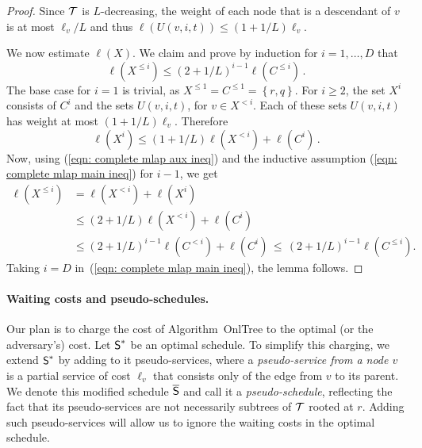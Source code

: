 \documentclass[a4paper]{article}
\newcommand{\calT}{{\cal T}}
\newcommand{\braced}[1]{{ \left\{ #1 \right\} }}
\newcommand{\length}{\ell}
\newcommand{\OnAlgTreesGeneral}{{\sc OnlTree}}
\newcommand{\optschedS}{\mbox{\rm\textsf{S}}^\ast}
\newcommand{\pseudoschedS}{\overline{\mbox{\rm\textsf{S}}}}
\begin{document}
\begin{proof}
Since $\calT$ is $L$-decreasing, the weight of each node that is a
descendant of $v$ is at most $\length_v/L$ and thus
$\length(U(v,i,t))\leq (1+1/L)\length_v$.

We now estimate $\length(X)$. We claim and prove by induction for
$i=1,\ldots,D$ that
\begin{equation}
\length(X^{\le i})\leq(2+1/L)^{i-1}\length(C^{\le i})\,.
	\label{eqn: complete mlap main ineq}
\end{equation}
The base case for $i=1$ is trivial, as $X^{\le 1}=C^{\le
  1}=\braced{r,q}$. For $i\geq 2$, the set
$X^i$ consists of $C^i$ and the sets $U(v,i,t)$,
for $v \in X^{<i}$. Each of these sets $U(v,i,t)$ has
weight at most $(1+1/L)\length_v$. Therefore
\begin{equation}
\length(X^i)\leq (1+1/L)\length(X^{<i})+\length(C^i)\,.
	\label{eqn: complete mlap aux ineq}
\end{equation}
Now, using (\ref{eqn: complete mlap aux ineq}) and the
inductive assumption (\ref{eqn: complete mlap main ineq}) for $i-1$,
we get
\begin{align*}
\length(X^{\le i})&= \length(X^{<i})+ \length(X^i)
			\\
			&\leq (2+1/L)\length(X^{<i})+\length(C^i)
			\\
			&\leq (2+1/L)^{i-1}\length(C^{<i})+\length(C^i)
			\,\leq\, (2+1/L)^{i-1}\length(C^{\le i}).
\end{align*}
Taking $i=D$ in~(\ref{eqn: complete mlap main ineq}), the lemma follows.
\end{proof}


\paragraph{Waiting costs and pseudo-schedules.}

Our plan is to charge the cost of Algorithm~{\OnAlgTreesGeneral} to
the optimal (or the adversary's) cost. Let $\optschedS$ be an optimal
schedule.  To simplify this charging, we extend $\optschedS$ by adding
to it pseudo-services, where a \emph{pseudo-service from a node $v$}
is a partial service of cost $\length_v$ that consists only of the
edge from $v$ to its parent.  We denote this modified schedule
$\pseudoschedS$ and call it a \emph{pseudo-schedule}, reflecting the
fact that its pseudo-services are not necessarily subtrees of $\calT$
rooted at $r$. Adding such pseudo-services will allow us to
ignore the waiting costs in the optimal schedule.
\end{document}
